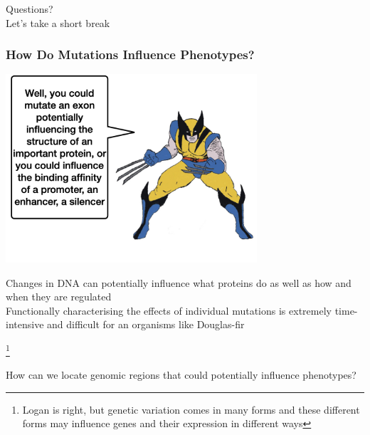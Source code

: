 \documentclass{beamer}
\newcommand\blfootnote[1]{%
	\begingroup
	\renewcommand\thefootnote{}\footnote{#1}%
	\addtocounter{footnote}{-1}%
	\endgroup
}
\begin{document}
\begin{frame}
	
	\Huge
	Questions? \\ \pause
	Let's take a short break
	
\end{frame}


\begin{frame}
	\frametitle{How Do Mutations Influence Phenotypes?}

	\centering	\includegraphics[keepaspectratio, width  = 0.7\textwidth]{img/loganTalking2}\\ \pause
	
	\scriptsize Changes in DNA can potentially influence what proteins do as well as how and when they are regulated \\
	\vspace{10pt}
	Functionally characterising the effects of individual mutations is extremely time-intensive and difficult for an organisms like Douglas-fir
	
	\blfootnote{Logan is right, but genetic variation comes in many forms and these different forms may influence genes and their expression in different ways}
\end{frame}

\begin{frame}
\Large 	How can we locate genomic regions that could potentially influence phenotypes?
\end{frame}
\end{document}
